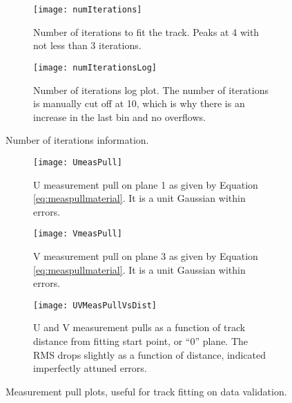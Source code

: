 \begin{figure}
    \centering
    \begin{subfigure}[]{0.8\textwidth}
        \centering
        \texttt{[image: numIterations]} 
        \caption{Number of iterations to fit the track. Peaks at 4 with not less than 3 iterations.}
    \end{subfigure}
    
    \begin{subfigure}[]{0.8\textwidth}
        \centering
        \texttt{[image: numIterationsLog]} 
        \caption{Number of iterations log plot. The number of iterations is manually cut off at 10, which is why there is an increase in the last bin and no overflows.}
    \end{subfigure}

    \caption{Number of iterations information.}
\end{figure}



\begin{figure}
    \centering
    \begin{subfigure}[]{0.65\textwidth}
        \centering
        \texttt{[image: UmeasPull]} 
        \caption{U measurement pull on plane 1 as given by Equation \ref{eq:measpullmaterial}. It is a unit Gaussian within errors.}
    \end{subfigure}
    
    \begin{subfigure}[]{0.65\textwidth}
        \centering
        \texttt{[image: VmeasPull]} 
        \caption{V measurement pull on plane 3 as given by Equation \ref{eq:measpullmaterial}. It is a unit Gaussian within errors.}
    \end{subfigure}

    \begin{subfigure}[]{0.65\textwidth}
        \centering
        \texttt{[image: UVMeasPullVsDist]} 
        \caption{U and V measurement pulls as a function of track distance from fitting start point, or ``0'' plane. The RMS drops slightly as a function of distance, indicated imperfectly attuned errors.}
    \end{subfigure}

    \caption{Measurement pull plots, useful for track fitting on data validation.}
\end{figure}



